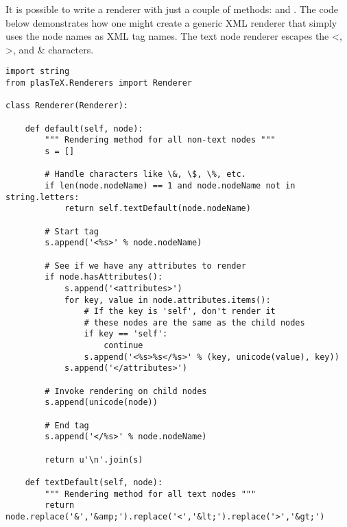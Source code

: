 It is possible to write a renderer with just a couple of methods:
 and .
The code below demonstrates how one might create a generic XML
renderer that simply uses the node names as XML tag names.
The text node renderer escapes the <, >, and \& characters.
\begin{verbatim}
import string
from plasTeX.Renderers import Renderer

class Renderer(Renderer):

    def default(self, node):
        """ Rendering method for all non-text nodes """
        s = []

        # Handle characters like \&, \$, \%, etc.
        if len(node.nodeName) == 1 and node.nodeName not in string.letters:
            return self.textDefault(node.nodeName)

        # Start tag
        s.append('<%s>' % node.nodeName)

        # See if we have any attributes to render
        if node.hasAttributes():
            s.append('<attributes>')
            for key, value in node.attributes.items():
                # If the key is 'self', don't render it
                # these nodes are the same as the child nodes
                if key == 'self':
                    continue
                s.append('<%s>%s</%s>' % (key, unicode(value), key))
            s.append('</attributes>')

        # Invoke rendering on child nodes
        s.append(unicode(node))

        # End tag
        s.append('</%s>' % node.nodeName)

        return u'\n'.join(s)

    def textDefault(self, node):
        """ Rendering method for all text nodes """
        return node.replace('&','&amp;').replace('<','&lt;').replace('>','&gt;')
\end{verbatim}


